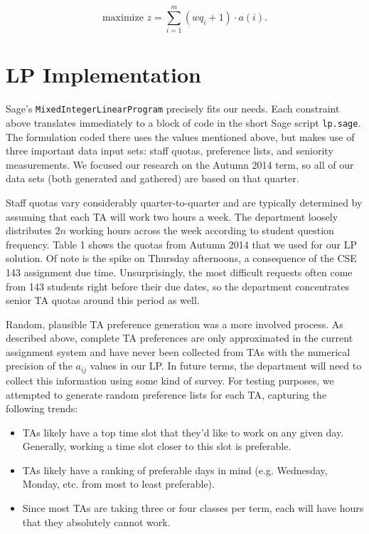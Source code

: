 \documentclass{article}
\begin{document}
\begin{multicols}{2}
\begin{equation}
\textrm{maximize } z = \sum_{i=1}^m(wq_i + 1)\cdot a(i).
\end{equation}

\section*{LP Implementation}

Sage's \texttt{MixedIntegerLinearProgram} precisely fits our needs. Each constraint above translates immediately to a block of code in the short Sage script \texttt{lp.sage}. The formulation coded there uses the values mentioned above, but makes use of three important data input sets: staff quotas, preference lists, and seniority measurements. We focused our research on the Autumn 2014 term, so all of our data sets (both generated and gathered) are based on that quarter.

Staff quotas vary considerably quarter-to-quarter and are typically determined by assuming that each TA will work two hours a week. The department loosely distributes $2n$ working hours across the week according to student question frequency. Table 1 shows the quotas from Autumn 2014 that we used for our LP solution. Of note is the spike on Thursday afternoons, a consequence of the CSE 143 assignment due time. Unsurprisingly, the most difficult requests often come from 143 students right before their due dates, so the department concentrates senior TA quotas around this period as well.

Random, plausible TA preference generation was a more involved process. As described above, complete TA preferences are only approximated in the current assignment system and have never been collected from TAs with the numerical precision of the $a_{ij}$ values in our LP. In future terms, the department will need to collect this information using some kind of survey. For testing purposes, we attempted to generate random preference lists for each TA, capturing the following trends:
\begin{itemize}
   \item TAs likely have a top time slot that they'd like to work on any given day. Generally, working a time slot closer to this slot is preferable.
   \item TAs likely have a ranking of preferable days in mind (e.g. Wednesday, Monday, etc. from most to least preferable).
   \item Since most TAs are taking three or four classes per term, each will have hours that they absolutely cannot work.
\end{itemize}


\end{multicols}
\end{document}
